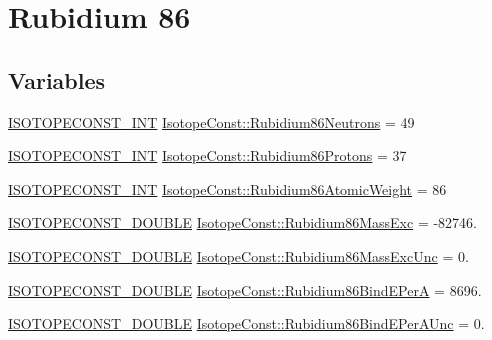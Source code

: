 \hypertarget{group___isotope_const-_rubidium-_rb86}{}\section{Rubidium 86}
\label{group___isotope_const-_rubidium-_rb86}
\subsection*{Variables}
\begin{DoxyCompactItemize}
\item 
\mbox{\hyperlink{group___isotope_const-_macros_ga5f18360b3e99483a35c32d789e62621c}{I\+S\+O\+T\+O\+P\+E\+C\+O\+N\+S\+T\+\_\+\+I\+NT}} \mbox{\hyperlink{group___isotope_const-_rubidium-_rb86_gab0a9e68245a8469ce60dc8a04b118ceb}{Isotope\+Const\+::\+Rubidium86\+Neutrons}} = 49
\item 
\mbox{\hyperlink{group___isotope_const-_macros_ga5f18360b3e99483a35c32d789e62621c}{I\+S\+O\+T\+O\+P\+E\+C\+O\+N\+S\+T\+\_\+\+I\+NT}} \mbox{\hyperlink{group___isotope_const-_rubidium-_rb86_ga0212867a0cdf0552328946f05fdd17dd}{Isotope\+Const\+::\+Rubidium86\+Protons}} = 37
\item 
\mbox{\hyperlink{group___isotope_const-_macros_ga5f18360b3e99483a35c32d789e62621c}{I\+S\+O\+T\+O\+P\+E\+C\+O\+N\+S\+T\+\_\+\+I\+NT}} \mbox{\hyperlink{group___isotope_const-_rubidium-_rb86_ga191b10334ad749a60d05e65e3321b953}{Isotope\+Const\+::\+Rubidium86\+Atomic\+Weight}} = 86
\item 
\mbox{\hyperlink{group___isotope_const-_macros_ga8f45a7272ce02c0b4c65c44636ed719a}{I\+S\+O\+T\+O\+P\+E\+C\+O\+N\+S\+T\+\_\+\+D\+O\+U\+B\+LE}} \mbox{\hyperlink{group___isotope_const-_rubidium-_rb86_gaa732a16a4be53e97d5d939486364e53a}{Isotope\+Const\+::\+Rubidium86\+Mass\+Exc}} = -\/82746.
\item 
\mbox{\hyperlink{group___isotope_const-_macros_ga8f45a7272ce02c0b4c65c44636ed719a}{I\+S\+O\+T\+O\+P\+E\+C\+O\+N\+S\+T\+\_\+\+D\+O\+U\+B\+LE}} \mbox{\hyperlink{group___isotope_const-_rubidium-_rb86_gac576ad97d0bb793165f3b19235c29e86}{Isotope\+Const\+::\+Rubidium86\+Mass\+Exc\+Unc}} = 0.
\item 
\mbox{\hyperlink{group___isotope_const-_macros_ga8f45a7272ce02c0b4c65c44636ed719a}{I\+S\+O\+T\+O\+P\+E\+C\+O\+N\+S\+T\+\_\+\+D\+O\+U\+B\+LE}} \mbox{\hyperlink{group___isotope_const-_rubidium-_rb86_gad615542075e28d733c6b266d50661f23}{Isotope\+Const\+::\+Rubidium86\+Bind\+E\+PerA}} = 8696.
\item 
\mbox{\hyperlink{group___isotope_const-_macros_ga8f45a7272ce02c0b4c65c44636ed719a}{I\+S\+O\+T\+O\+P\+E\+C\+O\+N\+S\+T\+\_\+\+D\+O\+U\+B\+LE}} \mbox{\hyperlink{group___isotope_const-_rubidium-_rb86_ga2db714cbd18c52d870549c00f6b7b57b}{Isotope\+Const\+::\+Rubidium86\+Bind\+E\+Per\+A\+Unc}} = 0.

\end{DoxyCompactItemize}
